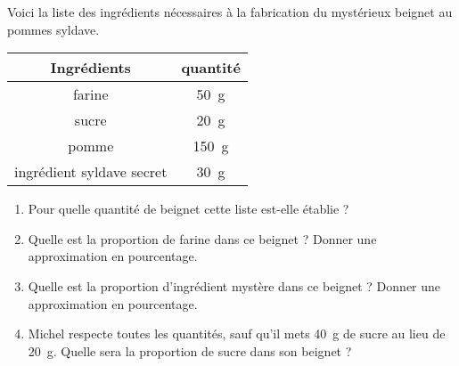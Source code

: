 
\begin{exercice}\label{exo2smath-0323}

    Voici la liste des ingrédients nécessaires à la fabrication du mystérieux beignet au pommes syldave.
    \begin{center}
    \begin{tabular}[]{|c||c|}
        \hline
        Ingrédients&quantité\\
        \hline\hline
        farine&\SI{50}{\gram}\\
        \hline
        sucre&\SI{20}{\gram}\\
        \hline
        pomme&\SI{150}{\gram}\\
        \hline
        ingrédient syldave secret&\SI{30}{\gram}\\
        \hline
    \end{tabular}
    \end{center}
    \begin{enumerate}
        \item
            Pour quelle quantité de beignet cette liste est-elle établie ?
        \item
            Quelle est la proportion de farine dans ce beignet ? Donner une approximation en pourcentage.
        \item
            Quelle est la proportion d'ingrédient mystère dans ce beignet ? Donner une approximation en pourcentage.
        \item
            Michel respecte toutes les quantités, sauf qu'il mets \SI{40}{\gram} de sucre au lieu de \SI{20}{\gram}. Quelle sera la proportion de sucre dans son beignet ?
    \end{enumerate}

\end{exercice}
